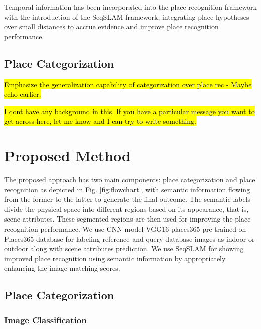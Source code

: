 \documentclass[letterpaper, 10 pt, conference]{ieeeconf}  %
\begin{document}
Temporal information has been incorporated into the place recognition framework with the introduction of the SeqSLAM framework, integrating place hypotheses over small distances to accrue evidence and improve place recognition performance. 




\subsection{Place Categorization}
\cite{sunderhauf2016place}

\hl{Emphasize the generalization capability of categorization over place rec  - Maybe echo earlier. }

\hl{I dont have any background in this. If you have a particular message you want to get across here, let me know and I can try to write something. }


\section{Proposed Method}
The proposed approach has two main components: place categorization and place recognition as depicted in Fig. \ref{fig:flowchart}, with semantic information flowing from the former to the latter to generate the final outcome. The semantic labels divide the physical space into different regions based on its appearance, that is, scene attributes. These segmented regions are then used for improving the place recognition performance. We use CNN model VGG16-places365 \cite{cnnPlaces365Github} pre-trained on Places365 database \cite{zhou2014learning} for labeling reference and query database images as indoor or outdoor along with scene attributes \cite{Patterson2012SunAttributes} prediction. We use SeqSLAM \cite{Milford2012} for showing improved place recognition using semantic information by appropriately enhancing the image matching scores.




\subsection{Place Categorization}

\subsubsection{Image Classification}

\end{document}
